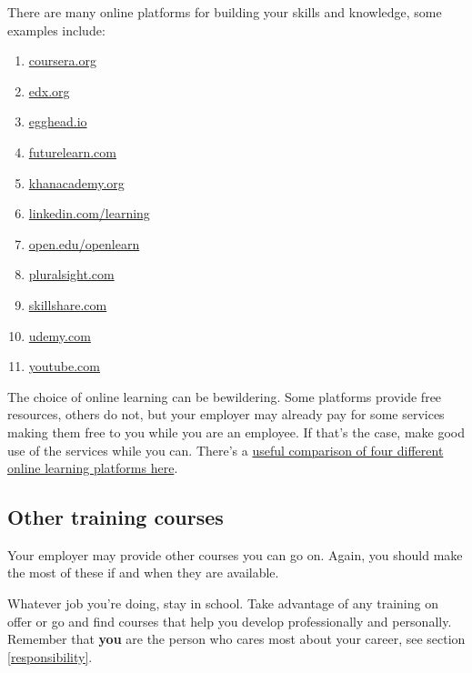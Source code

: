 \documentclass[
]{book}
\providecommand{\tightlist}{%
  \setlength{\itemsep}{0pt}\setlength{\parskip}{0pt}}
\begin{document}
There are many online platforms for building your skills and knowledge, some examples include:

\begin{enumerate}
\def\labelenumi{\arabic{enumi}.}
\tightlist
\item
  \href{https://www.coursera.org}{coursera.org}
\item
  \href{https://www.edx.org}{edx.org}
\item
  \href{https://egghead.io/}{egghead.io}
\item
  \href{https://www.futurelearn.com/}{futurelearn.com}
\item
  \href{https://www.khanacademy.org/}{khanacademy.org}
\item
  \href{https://www.linkedin.com/learning}{linkedin.com/learning}
\item
  \href{https://www.open.edu/openlearn/}{open.edu/openlearn}
\item
  \href{https://www.pluralsight.com}{pluralsight.com}
\item
  \href{https://www.skillshare.com/}{skillshare.com}
\item
  \href{https://www.udemy.com}{udemy.com}
\item
  \href{https://www.youtube.com/}{youtube.com}
\end{enumerate}

The choice of online learning can be bewildering. Some platforms provide free resources, others do not, but your employer may already pay for some services making them free to you while you are an employee. If that's the case, make good use of the services while you can. There's a \href{https://www.businessinsider.com/online-learning-platform-comparison-udemy-skillshare-lynda-coursera}{useful comparison of four different online learning platforms here}. \citep{udemy}

\hypertarget{othertrain}{%
\subsection{Other training courses}\label{othertrain}}

Your employer may provide other courses you can go on. Again, you should make the most of these if and when they are available.

Whatever job you're doing, stay in school. Take advantage of any training on offer or go and find courses that help you develop professionally and personally. Remember that \textbf{you} are the person who cares most about your career, see section \ref{responsibility}.
\end{document}
